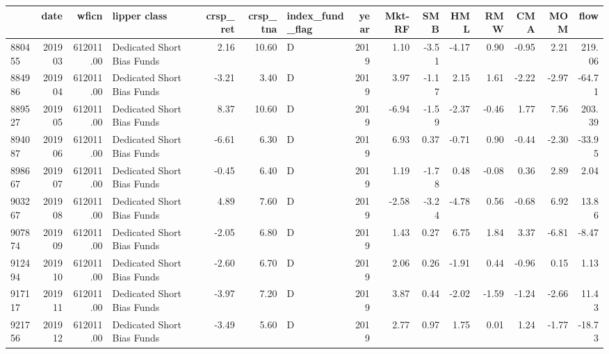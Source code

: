 \begin{tabular}{lrrlrrlrrrrrrrr}
\toprule
 & date & wficn & lipper class & crsp_ret & crsp_tna & index_fund_flag & year & Mkt-RF & SMB & HML & RMW & CMA & MOM & flow \\
\midrule
880455 & 201903 & 612011.00 & Dedicated Short Bias Funds & 2.16 & 10.60 & D & 2019 & 1.10 & -3.51 & -4.17 & 0.90 & -0.95 & 2.21 & 219.06 \\
884986 & 201904 & 612011.00 & Dedicated Short Bias Funds & -3.21 & 3.40 & D & 2019 & 3.97 & -1.17 & 2.15 & 1.61 & -2.22 & -2.97 & -64.71 \\
889527 & 201905 & 612011.00 & Dedicated Short Bias Funds & 8.37 & 10.60 & D & 2019 & -6.94 & -1.59 & -2.37 & -0.46 & 1.77 & 7.56 & 203.39 \\
894087 & 201906 & 612011.00 & Dedicated Short Bias Funds & -6.61 & 6.30 & D & 2019 & 6.93 & 0.37 & -0.71 & 0.90 & -0.44 & -2.30 & -33.95 \\
898667 & 201907 & 612011.00 & Dedicated Short Bias Funds & -0.45 & 6.40 & D & 2019 & 1.19 & -1.78 & 0.48 & -0.08 & 0.36 & 2.89 & 2.04 \\
903267 & 201908 & 612011.00 & Dedicated Short Bias Funds & 4.89 & 7.60 & D & 2019 & -2.58 & -3.24 & -4.78 & 0.56 & -0.68 & 6.92 & 13.86 \\
907874 & 201909 & 612011.00 & Dedicated Short Bias Funds & -2.05 & 6.80 & D & 2019 & 1.43 & 0.27 & 6.75 & 1.84 & 3.37 & -6.81 & -8.47 \\
912494 & 201910 & 612011.00 & Dedicated Short Bias Funds & -2.60 & 6.70 & D & 2019 & 2.06 & 0.26 & -1.91 & 0.44 & -0.96 & 0.15 & 1.13 \\
917117 & 201911 & 612011.00 & Dedicated Short Bias Funds & -3.97 & 7.20 & D & 2019 & 3.87 & 0.44 & -2.02 & -1.59 & -1.24 & -2.66 & 11.43 \\
921756 & 201912 & 612011.00 & Dedicated Short Bias Funds & -3.49 & 5.60 & D & 2019 & 2.77 & 0.97 & 1.75 & 0.01 & 1.24 & -1.77 & -18.73 \\
\bottomrule
\end{tabular}
